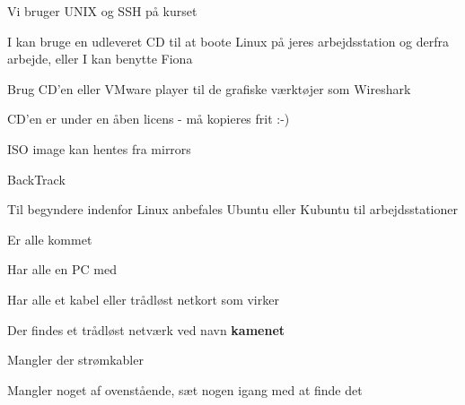 \documentclass[Screen16to9,17pt]{foils}
\begin{document}

\begin{list1}
\item Vi bruger UNIX og SSH på kurset
\item I kan bruge en udleveret CD til at boote Linux på jeres
  arbejdsstation og derfra arbejde, eller I kan benytte Fiona
\item Brug CD'en eller VMware player til de grafiske værktøjer som Wireshark
\item CD'en er under en åben licens - må kopieres frit :-)
\item ISO image kan hentes fra mirrors
\item BackTrack 
\item Til begyndere indenfor Linux anbefales Ubuntu eller Kubuntu til
  arbejdsstationer
\end{list1}


\begin{list1}
\item Er alle kommet
\item Har alle en PC med
\item Har alle et kabel eller trådløst netkort som virker
\item Der findes et trådløst netværk ved navn {\bf kamenet}
\item Mangler der strømkabler
\item Mangler noget af ovenstående, sæt nogen igang med at finde det
\end{list1}
\end{document}
